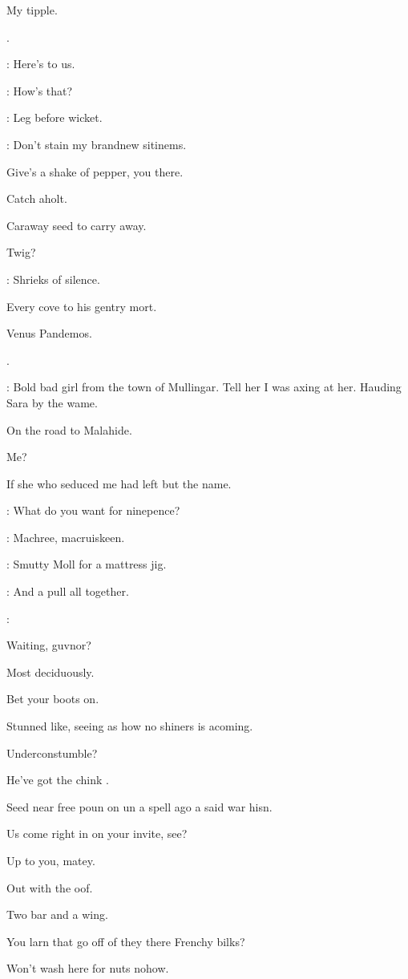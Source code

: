 My tipple.

.

\dixon:
Here's to us.

\madden:
How's that?

\lynch:
Leg before wicket.

\mulligan:
Don't stain my brandnew sitinems.

Give's a shake of pepper,
you there.

Catch aholt.

Caraway seed to carry away.

Twig?

:
Shrieks of silence.

Every cove to his gentry mort.

Venus Pandemos.

.

\bannon:
Bold bad girl from the town of Mullingar.
Tell her I was axing at her.
Hauding Sara by the wame.

On the road to Malahide.

Me?

If she who seduced me had left but the name.

\lenehan:
What do you want for ninepence?

\stephen:
Machree,
macruiskeen.

\lynch:
Smutty Moll for a mattress jig.

\punch:
And a pull all together.

\All:


Waiting,
guvnor?

Most deciduously.

Bet your boots on.

Stunned like,
seeing as how no shiners is acoming.

Underconstumble?

He've got the chink .

Seed near free poun on un a spell ago a said war hisn.

Us come right in on your invite,
see?

Up to you,
matey.

Out with the oof.

Two bar and a wing.

You larn that go off of they there Frenchy bilks?

Won't wash here for nuts nohow.

